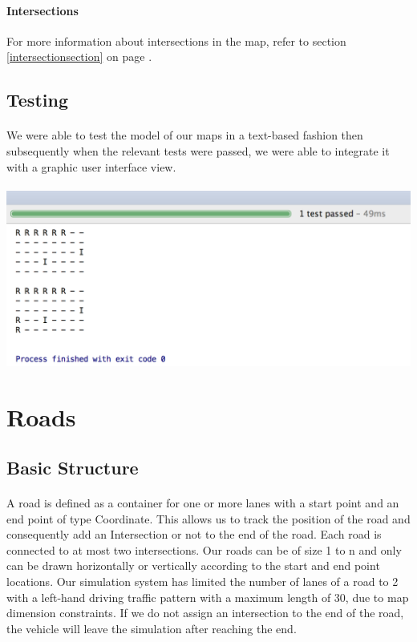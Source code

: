 \documentclass[a4paper,11pt,titlepage]{article}
\begin{document}
\paragraph{Intersections} For more information about intersections in the map, refer to section \ref{intersectionsection} on page \pageref{intersectionsection}.
\subsection{Testing}
\paragraph{}
We were able to test the model of our maps in a text-based fashion then subsequently when the relevant tests were passed, we were able to integrate it with a graphic user interface view.
\paragraph{}
\centerline{ \includegraphics[scale=0.5]{test_mapgrid}}

\section{Roads}\label{roadsection}
\subsection{Basic Structure}
\paragraph{}
A road is defined as a container for one or more lanes with a start point and an end point of type Coordinate. This allows us to track the position of the road and consequently add an Intersection or not to the end of the road. Each road is connected to at most two intersections. Our roads can be of size 1 to n and only can be drawn horizontally or vertically according to the start and end point locations. Our simulation system has limited the number of lanes of a road to 2 with a left-hand driving traffic pattern with a maximum length of 30, due to map dimension constraints. If we do not assign an intersection to the end of the road, the vehicle will leave the simulation after reaching the end.
\end{document}
